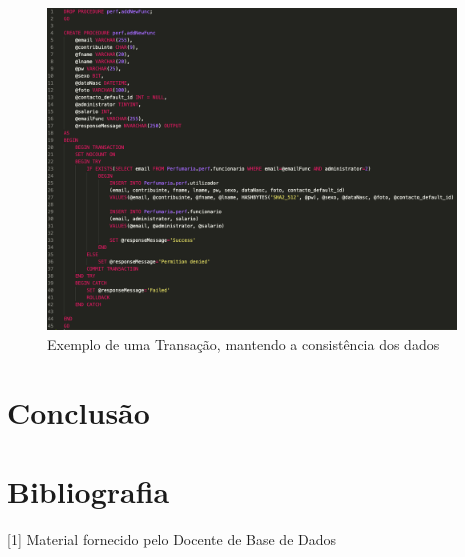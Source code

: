 \documentclass[10pt,portuguese]{article}
\begin{document}
\begin{figure}[!h]
    \centering
    \includegraphics[width=410]{images/addNewFunc.png}
    \caption{Exemplo de uma Transação, mantendo a consistência dos dados}
\end{figure}

\section{Conclusão}

\clearpage

\section{Bibliografia}





\vspace{5mm} %

[1] Material fornecido pelo Docente de Base de Dados
\end{document}
